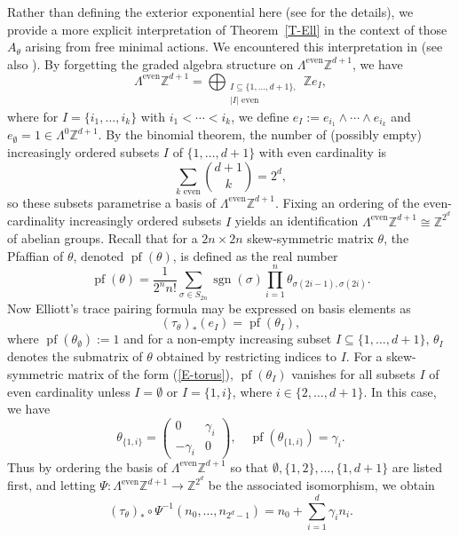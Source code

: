 \documentclass[11pt,a4paper,leqno]{amsart}
\theoremstyle{definition}
\theoremstyle{remark}
\numberwithin{equation}{section}
\theoremstyle{plain}
\newcommand{\Zb}{\mathbb{Z}}
\begin{document}
Rather than defining the exterior exponential here (see \cite{Ell84,Rie88} for the details), we provide a more explicit interpretation of Theorem~\ref{T-Ell} in the context of those $A_\theta$ arising from free minimal actions. We encountered this interpretation in \cite[Theorem 5.7.1]{ProSch16} (see also \cite[Proposition 4.1]{BenMat18}). By forgetting the graded algebra structure on $\Lambda^{\mathrm{even}}\Zb^{d+1}$, we have  
\[
	\Lambda^{\mathrm{even}}\Zb^{d+1} = \bigoplus_{\substack{I\subseteq \{1,\ldots,d+1\}, \\ |I| \text{ even}}} \Zb e_{I},  
\]
where for $I = \{i_1,\ldots,i_k\}$ with $i_1 < \cdots < i_k$, we define $e_I := e_{i_1} \wedge \cdots \wedge e_{i_k}$ and $e_{\emptyset} = 1 \in \Lambda^0\Zb^{d+1}$. By the binomial theorem, the number of (possibly empty) increasingly ordered subsets $I$ of $\{1,\ldots,d+1\}$ with even cardinality is
\[
\sum_{k \text{ even}} {{d+1}\choose{k}} = 2^d,
\] 
so these subsets parametrise a basis of $\Lambda^{\mathrm{even}}\Zb^{d+1}$. Fixing an ordering of the even-cardinality increasingly ordered subsets $I$ yields an identification $\Lambda^{\mathrm{even}}\Zb^{d+1} \cong \Zb^{2^d}$ of abelian groups. Recall that for a $2n\times 2n$ skew-symmetric matrix $\theta$, the Pfaffian of $\theta$, denoted $\operatorname{pf}(\theta)$, is defined as the real number 
\[
	\operatorname{pf}(\theta) = \frac{1}{2^n n!} \sum_{\sigma \in S_{2n}} \operatorname{sgn}(\sigma) \prod_{i=1}^n \theta_{\sigma(2i-1),\sigma(2i)}.
\]
Now Elliott's trace pairing formula may be expressed on basis elements as 
\begin{equation}
	(\tau_\theta)_*(e_I) = \operatorname{pf}(\theta_I),
\end{equation}
where $\operatorname{pf}(\theta_{\emptyset}) := 1$ and for a non-empty increasing subset $I\subseteq \{1,\ldots,d+1\}$, $\theta_I$ denotes the submatrix of $\theta$ obtained by restricting indices to $I$. For a skew-symmetric matrix of the form (\ref{E-torus}), $\operatorname{pf}(\theta_I)$ vanishes for all subsets $I$ of even cardinality unless $I = \emptyset$ or $I = \{1,i\}$, where $i\in \{2,\ldots,d+1\}$. In this case, we have 
\[
	\theta_{\{1,i\}} = \begin{pmatrix}
		0 & \gamma_i\\
		-\gamma_i & 0
	\end{pmatrix}, \quad \operatorname{pf}(\theta_{\{1,i\}}) = \gamma_i.
\]
Thus by ordering the basis of $\Lambda^{\mathrm{even}}\Zb^{d+1}$ so that $\emptyset, \{1,2\}, \ldots, \{1,d+1\}$ are listed first, and letting $\Psi : \Lambda^{\mathrm{even}}\Zb^{d+1} \to \Zb^{2^d}$ be the associated isomorphism, we obtain 
\begin{equation}
	(\tau_\theta)_* \circ \Psi^{-1}(n_0,\ldots,n_{2^d-1}) = n_0 + \sum_{i=1}^d \gamma_i n_i.
\end{equation}
\end{document}
